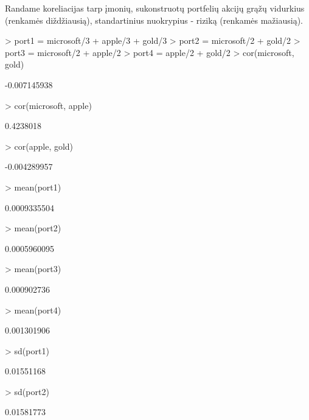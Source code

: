 \documentclass[a4paper]{article}
\begin{document}
\begin{Schunk}
Randame koreliacijas tarp įmonių, sukonstruotų portfelių akcijų grąžų vidurkius (renkamės diždžiausią), standartinius
nuokrypius - riziką (renkamės mažiausią).


\begin{Sinput}
> port1 = microsoft/3 + apple/3 + gold/3
> port2 = microsoft/2 + gold/2
> port3 = microsoft/2 + apple/2
> port4 = apple/2 + gold/2
> cor(microsoft, gold)
\end{Sinput}
\begin{Soutput}
[1] -0.007145938
\end{Soutput}
\begin{Sinput}
> cor(microsoft, apple)
\end{Sinput}
\begin{Soutput}
[1] 0.4238018
\end{Soutput}
\begin{Sinput}
> cor(apple, gold)
\end{Sinput}
\begin{Soutput}
[1] -0.004289957
\end{Soutput}
\begin{Sinput}
> mean(port1)
\end{Sinput}
\begin{Soutput}
[1] 0.0009335504
\end{Soutput}
\begin{Sinput}
> mean(port2)
\end{Sinput}
\begin{Soutput}
[1] 0.0005960095
\end{Soutput}
\begin{Sinput}
> mean(port3)
\end{Sinput}
\begin{Soutput}
[1] 0.000902736
\end{Soutput}
\begin{Sinput}
> mean(port4)
\end{Sinput}
\begin{Soutput}
[1] 0.001301906
\end{Soutput}
\begin{Sinput}
> sd(port1)
\end{Sinput}
\begin{Soutput}
[1] 0.01551168
\end{Soutput}
\begin{Sinput}
> sd(port2)
\end{Sinput}
\begin{Soutput}
[1] 0.01581773
\end{Soutput}
\begin{Sinput}

\end{Sinput}
\end{Schunk}
\end{document}

